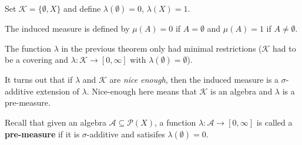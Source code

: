 \begin{ex}[]
  Set $\mathcal{K} = \{\emptyset,X\}$ and define $\lambda(\emptyset) = 0$, $\lambda(X) = 1$.

  The induced measure is defined by $\mu(A) = 0$ if $A = \emptyset$ and $\mu(A) = 1$ if $A \neq \emptyset$.
\end{ex}

The function $\lambda$ in the previous theorem only had minimal restrictions ($\mathcal{K}$ had to be a covering and $\lambda: \mathcal{K} \to  [0,\infty]$ with $\lambda(\emptyset) = \emptyset$).

It turns out that if $\lambda$ and $\mathcal{K}$ are \emph{nice enough}, then the induced measure is a $\sigma$-additive extension of $\lambda$.
Nice-enough here means that $\mathcal{K}$ is an algebra and $\lambda$ is a pre-measure.

Recall that given an algebra $\mathcal{A} \subseteq \mathcal{P}(X)$, 
a function $\lambda: \mathcal{A} \to [0,\infty]$ is called a \textbf{pre-measure} if it is $\sigma$-additive and satisifes $\lambda(\emptyset) = 0$.


